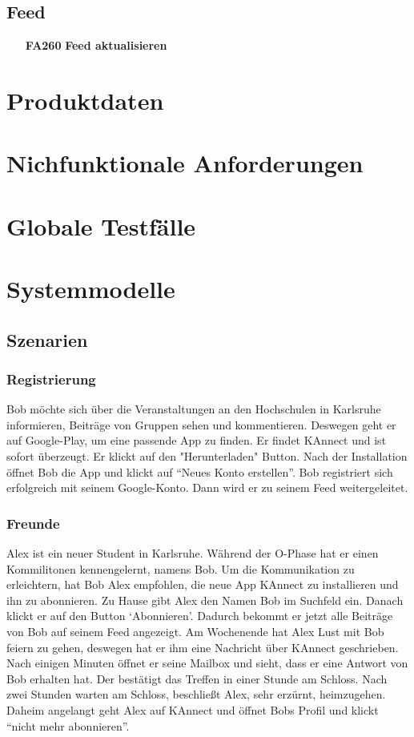 \documentclass[parskip=full]{scrartcl}
\begin{document}
		\subsection{Feed}
		\begin{itemize}[nosep]
			\item[\textbf{FA260}]\textbf{Feed aktualisieren}
		\end{itemize}
	\section{Produktdaten}
	
	\section{Nichfunktionale Anforderungen}
	
	\section{Globale Testfälle}
	
	\section{Systemmodelle}
	\subsection{Szenarien}
		\subsubsection{Registrierung}
		Bob möchte sich über die Veranstaltungen an den Hochschulen in Karlsruhe informieren, Beiträge von Gruppen sehen und kommentieren. Deswegen geht er auf Google-Play, um eine passende App zu finden. Er findet KAnnect und ist sofort überzeugt. Er klickt auf den "Herunterladen" Button. Nach der Installation öffnet Bob die App und klickt auf “Neues Konto erstellen”. Bob registriert sich erfolgreich mit seinem Google-Konto. Dann wird er zu seinem Feed weitergeleitet.
		
		\subsubsection{Freunde}
		Alex ist ein neuer Student in Karlsruhe.  Während der O-Phase hat er einen Kommilitonen kennengelernt, namens Bob. Um die Kommunikation zu erleichtern, hat Bob Alex empfohlen, die neue App  KAnnect zu installieren und ihn zu abonnieren. Zu Hause gibt Alex den Namen Bob im Suchfeld ein. Danach klickt er auf den Button ‘Abonnieren’. Dadurch bekommt er jetzt alle Beiträge von Bob auf seinem Feed angezeigt. Am Wochenende hat Alex Lust mit Bob feiern zu gehen, deswegen hat er ihm eine Nachricht über KAnnect geschrieben. Nach einigen Minuten öffnet er seine Mailbox und sieht, dass er eine Antwort von Bob erhalten hat. Der bestätigt das Treffen in einer Stunde am Schloss. Nach zwei Stunden warten am Schloss, beschließt Alex, sehr erzürnt, heimzugehen. Daheim angelangt geht Alex auf KAnnect und öffnet Bobs Profil und klickt “nicht mehr abonnieren”.
		
\end{document}
